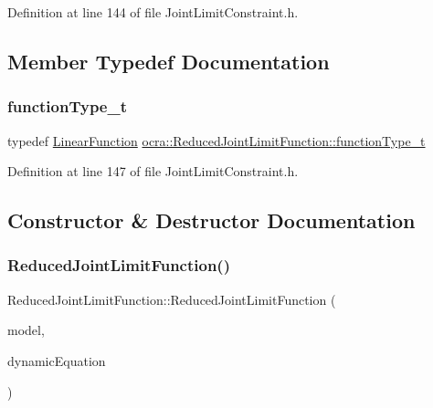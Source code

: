 Definition at line 144 of file Joint\+Limit\+Constraint.\+h.



\subsection{Member Typedef Documentation}
\hypertarget{classocra_1_1ReducedJointLimitFunction_a899e4871502f5e5509349b1f8eb5dfa8}{}\label{classocra_1_1ReducedJointLimitFunction_a899e4871502f5e5509349b1f8eb5dfa8} 
\subsubsection{\texorpdfstring{function\+Type\+\_\+t}{functionType\_t}}
{\footnotesize\ttfamily typedef \hyperlink{classocra_1_1LinearFunction}{Linear\+Function} \hyperlink{classocra_1_1ReducedJointLimitFunction_a899e4871502f5e5509349b1f8eb5dfa8}{ocra\+::\+Reduced\+Joint\+Limit\+Function\+::function\+Type\+\_\+t}}



Definition at line 147 of file Joint\+Limit\+Constraint.\+h.



\subsection{Constructor \& Destructor Documentation}
\hypertarget{classocra_1_1ReducedJointLimitFunction_afe65f4b9229680de647bb06fd7ae5b44}{}\label{classocra_1_1ReducedJointLimitFunction_afe65f4b9229680de647bb06fd7ae5b44} 
\subsubsection{\texorpdfstring{Reduced\+Joint\+Limit\+Function()}{ReducedJointLimitFunction()}}
{\footnotesize\ttfamily Reduced\+Joint\+Limit\+Function\+::\+Reduced\+Joint\+Limit\+Function (\begin{DoxyParamCaption}\item[{const Model \&}]{model,  }\item[{const \hyperlink{classocra_1_1FullDynamicEquationFunction}{Full\+Dynamic\+Equation\+Function} \&}]{dynamic\+Equation }\end{DoxyParamCaption})}

